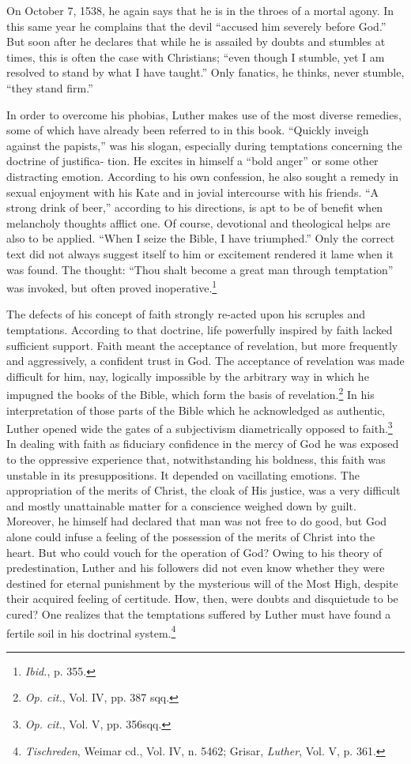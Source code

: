 On October 7, 1538, he again says that he is in the throes of a
mortal agony. In this same year he complains that the devil “accused
him severely before God.” But soon after he declares that while he is
assailed by doubts and stumbles at times, this is often the case with
Christians; “even though I stumble, yet I am resolved to stand by
what I have taught.” Only fanatics, he thinks, never stumble, “they
stand firm.”

In order to overcome his phobias, Luther makes use of the most
diverse remedies, some of which have already been referred to in
this book. “Quickly inveigh against the papists,” was his slogan,
especially during temptations concerning the doctrine of justifica-
tion. He excites in himself a “bold anger” or some other distracting
emotion. According to his own confession, he also sought a remedy in
sexual enjoyment with his Kate and in jovial intercourse with his
friends. “A strong drink of beer,” according to his directions, is apt
to be of benefit when melancholy thoughts afflict one. Of course,
devotional and theological helps are also to be applied. “When I seize
the Bible, I have triumphed.” Only the correct text did not always
suggest itself to him or excitement rendered it lame when it was
found. The thought: “Thou shalt become a great man through temptation”
was invoked, but often proved inoperative.\footnote{\textit{Ibid.}, p. 355.}

The defects of his concept of faith strongly re-acted upon his
scruples and temptations. According to that doctrine, life powerfully
inspired by faith lacked sufficient support. Faith meant the acceptance
of revelation, but more frequently and aggressively, a confident trust
in God. The acceptance of revelation was made difficult for him, nay,
logically impossible by the arbitrary way in which he impugned the
books of the Bible, which form the basis of revelation.\footnote
{\textit{Op. cit.}, Vol. IV, pp. 387 sqq.}
In his interpretation
of those parts of the Bible which he acknowledged as
authentic, Luther opened wide the gates of a subjectivism diametrically
opposed to faith.\footnote{\textit{Op. cit.}, Vol. V, pp. 356sqq.}
In dealing with faith as fiduciary confidence
in the mercy of God he was exposed to the oppressive experience that,
notwithstanding his boldness, this faith was unstable in its presuppositions.
It depended on vacillating emotions. The appropriation of
the merits of Christ, the cloak of His justice, was a very difficult and
mostly unattainable matter for a conscience weighed down by guilt.
Moreover, he himself had declared that man was not free to do good,
but God alone could infuse a feeling of the possession of the merits
of Christ into the heart. But who could vouch for the operation
of God? Owing to his theory of predestination, Luther and his followers
did not even know whether they were destined for eternal
punishment by the mysterious will of the Most High, despite their
acquired feeling of certitude. How, then, were doubts and disquietude
to be cured? One realizes that the temptations suffered by Luther
must have found a fertile soil in his doctrinal system.\footnote{\textit{Tischreden}, Weimar cd., Vol. IV, n. 5462; Grisar, \textit{Luther}, Vol. V, p. 361.}



